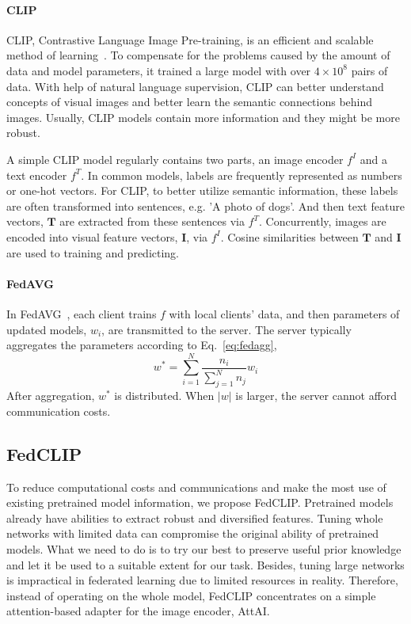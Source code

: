 \documentclass[11pt]{article}
\newcommand{\equationname}{Eq.}
\newcommand{\method}{FedCLIP\xspace}
\newcommand{\mecom}{AttAI\xspace}
\newcommand{\wjd}[1]{{\color{cyan}{[(WJD): #1]}}}
\begin{document}
\paragraph{CLIP}

CLIP, Contrastive Language Image Pre-training, is an efficient and scalable method of learning~\cite{Jindong-radford2021learning}.
To compensate for the problems caused by the amount of data and model parameters, it trained a large model with over $4\times 10^8$ pairs of data.
With help of natural language supervision, CLIP can better understand concepts of visual images and better learn the semantic connections behind images.
Usually, CLIP models contain more information and they might be more robust.

A simple CLIP model regularly contains two parts, an image encoder $f^I$ and a text encoder $f^T$.
In common models, labels are frequently represented as numbers or one-hot vectors.
For CLIP, to better utilize semantic information, these labels are often transformed into sentences, e.g. 'A photo of dogs'.
And then text feature vectors, $\mathbf{T}$ are extracted from these sentences via $f^T$.
Concurrently, images are encoded into visual feature vectors, $\mathbf{I}$, via $f^I$.
Cosine similarities between $\mathbf{T}$ and $\mathbf{I}$ are used to training and predicting.

\paragraph{FedAVG}
In FedAVG~\cite{Jindong-mcmahan2017communication}, each client trains $f$ with local clients' data, and then parameters of updated models, $w_i$, are transmitted to the server.
The server typically aggregates the parameters according to \equationname~\ref{eq:fedagg},
\begin{equation}
    w^*=\sum_{i=1}^N \frac{n_i}{\sum_{j=1}^N n_j} w_i
    \label{eq:fedagg}
\end{equation}
After aggregation, $w^*$ is distributed. %
When $|w|$ is larger, the server cannot afford communication costs.

\subsection{\method}
To reduce computational costs and communications and make the most use of existing pretrained model information, we propose \method.
Pretrained models already have abilities to extract robust and diversified features.
Tuning whole networks with limited data can compromise the original ability of pretrained models.
What we need to do is to try our best to preserve useful prior knowledge and let it be used to a suitable extent for our task.
Besides, tuning large networks is impractical in federated learning due to limited resources in reality.
Therefore, instead of operating on the whole model, \method concentrates on a simple attention-based adapter for the image encoder, \mecom.
\end{document}

